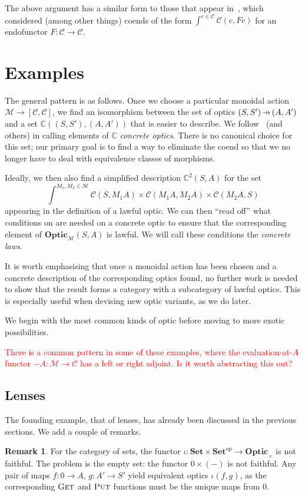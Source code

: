 \documentclass[11pt,letterpaper]{article}
\theoremstyle{plain}
\theoremstyle{definition}
\newtheorem{remark}[theorem]{Remark}
\newcommand{\C}{\mathscr{C}}
\newcommand{\M}{\mathscr{M}}
\newcommand{\Set}{\mathbf{Set}}
\newcommand{\Optic}{\mathbf{Optic}}
\newcommand{\conc}{\mathbb{C}}
\newcommand{\conctwice}{\mathbb{C}^2}
\newcommand{\op}{\mathrm{op}}
\newcommand{\fget}{\textsc{Get}}
\newcommand{\fput}{\textsc{Put}}
\newcommand{\hto}{\ensuremath{\,\mathaccent\shortmid\rightarrow\,}}
\newcommand{\todo}[1]{\textcolor{red}{\small #1}}
\begin{document}
The above argument has a similar form to those that appear in~\cite{OnTheTrace}, which considered (among other things) coends of the form $\int^{c \in \C} \C(c, Fc)$ for an endofunctor $F : \C \to \C$.

\section{Examples}\label{sec:examples}

The general pattern is as follows. Once we choose a particular monoidal action $\M \to [\C, \C]$, we find an isomorphism between the set of optics $(S, S') \hto (A, A')$ and a set $\conc((S, S'), (A, A'))$ that is easier to describe. We follow~\cite{ProfunctorOptics} (and others) in calling elements of $\conc$ \emph{concrete optics}. There is no canonical choice for this set; our primary goal is to find a way to eliminate the coend so that we no longer have to deal with equivalence classes of morphisms.

Ideally, we then also find a simplified description $\conctwice(S, A)$ for the set \[ \int^{M_1, M_2 \in \M} \C(S, M_1 A) \times \C(M_1 A, M_2 A) \times \C(M_2 A, S)\] appearing in the definition of a lawful optic. We can then ``read off'' what conditions on are needed on a concrete optic to ensure that the corresponding element of $\Optic_\M(S, A)$ is lawful. We will call these conditions the \emph{concrete laws}.

It is worth emphasising that once a monoidal action has been chosen and a concrete description of the corresponding optics found, no further work is needed to show that the result forms a category with a subcategory of lawful optics. This is especially useful when devising new optic variants, as we do later.

We begin with the most common kinds of optic before moving to more exotic possibilities.

\todo{There is a common pattern in some of these examples, where the evaluation-at-$A$ functor $-A : \M \to \C$ has a left or right adjoint. Is it worth abstracting this out?}

\subsection{Lenses}

The founding example, that of lenses, has already been discussed in the previous sections. We add a couple of remarks.

\begin{remark}\label{lens-iota-not-faithful}
  For the category of sets, the functor $\iota : \Set \times \Set^\op \to \Optic_\times$ is not faithful. The problem is the empty set: the functor $0 \times (-)$ is not faithful. Any pair of maps $f : 0 \to A$, $g : A' \to S'$ yield equivalent optics $\iota(f, g)$, as the corresponding $\fget$ and $\fput$ functions must be the unique maps from $0$.
\end{remark}
\end{document}
